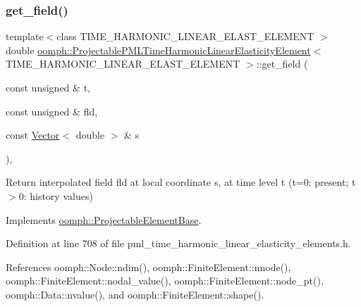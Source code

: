 \subsubsection{\texorpdfstring{get\+\_\+field()}{get\_field()}}
{\footnotesize\ttfamily template$<$class T\+I\+M\+E\+\_\+\+H\+A\+R\+M\+O\+N\+I\+C\+\_\+\+L\+I\+N\+E\+A\+R\+\_\+\+E\+L\+A\+S\+T\+\_\+\+E\+L\+E\+M\+E\+NT $>$ \\
double \hyperlink{classoomph_1_1ProjectablePMLTimeHarmonicLinearElasticityElement}{oomph\+::\+Projectable\+P\+M\+L\+Time\+Harmonic\+Linear\+Elasticity\+Element}$<$ T\+I\+M\+E\+\_\+\+H\+A\+R\+M\+O\+N\+I\+C\+\_\+\+L\+I\+N\+E\+A\+R\+\_\+\+E\+L\+A\+S\+T\+\_\+\+E\+L\+E\+M\+E\+NT $>$\+::get\+\_\+field (\begin{DoxyParamCaption}\item[{const unsigned \&}]{t,  }\item[{const unsigned \&}]{fld,  }\item[{const \hyperlink{classoomph_1_1Vector}{Vector}$<$ double $>$ \&}]{s }\end{DoxyParamCaption})\hspace{0.3cm}{\ttfamily [inline]}, {\ttfamily [virtual]}}



Return interpolated field fld at local coordinate s, at time level t (t=0\+: present; t$>$0\+: history values) 



Implements \hyperlink{classoomph_1_1ProjectableElementBase_ae4da5b565b6d333be2f5920f7be763cd}{oomph\+::\+Projectable\+Element\+Base}.



Definition at line 708 of file pml\+\_\+time\+\_\+harmonic\+\_\+linear\+\_\+elasticity\+\_\+elements.\+h.



References oomph\+::\+Node\+::ndim(), oomph\+::\+Finite\+Element\+::nnode(), oomph\+::\+Finite\+Element\+::nodal\+\_\+value(), oomph\+::\+Finite\+Element\+::node\+\_\+pt(), oomph\+::\+Data\+::nvalue(), and oomph\+::\+Finite\+Element\+::shape().

\mbox{\label{classoomph_1_1ProjectablePMLTimeHarmonicLinearElasticityElement_abc19b33b7f42c1dae69f0b64c7e05c61}} 
